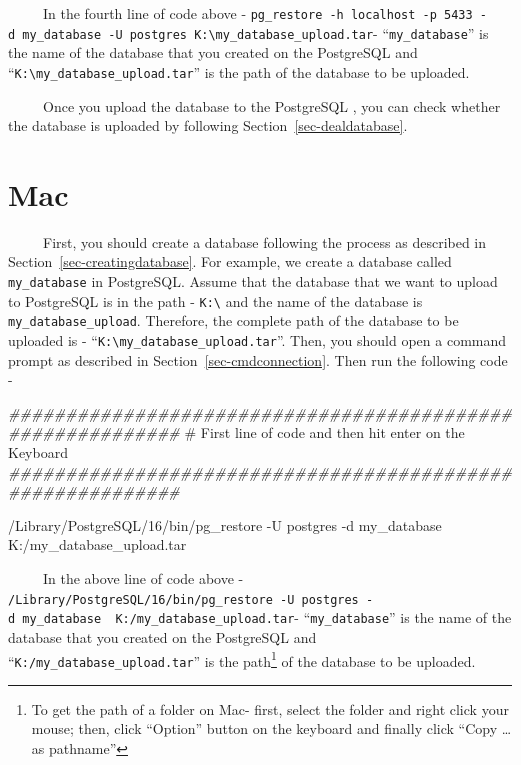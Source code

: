 \documentclass[
  letterpaper,
  DIV=11,
  numbers=noendperiod]{scrreprt}
\newenvironment{Shaded}{\begin{snugshade}}{\end{snugshade}}
\newcommand{\CommentTok}[1]{\textcolor[rgb]{0.37,0.37,0.37}{#1}}
\newcommand{\DecValTok}[1]{\textcolor[rgb]{0.68,0.00,0.00}{#1}}
\newcommand{\DocumentationTok}[1]{\textcolor[rgb]{0.37,0.37,0.37}{\textit{#1}}}
\newcommand{\ErrorTok}[1]{\textcolor[rgb]{0.68,0.00,0.00}{#1}}
\newcommand{\NormalTok}[1]{\textcolor[rgb]{0.00,0.23,0.31}{#1}}
\newcommand{\SpecialCharTok}[1]{\textcolor[rgb]{0.37,0.37,0.37}{#1}}
\begin{document}
~~~~~In the fourth line of code above -
\texttt{pg\_restore\ -h\ localhost\ -p\ 5433\ -d\ my\_database\ -U\ postgres\ K:\textbackslash{}my\_database\_upload.tar}-
``\texttt{my\_database}'' is the name of the database that you created
on the PostgreSQL and
``\texttt{K:\textbackslash{}my\_database\_upload.tar}'' is the path of
the database to be uploaded.

~~~~~Once you upload the database to the PostgreSQL , you can check
whether the database is uploaded by following
Section~\ref{sec-dealdatabase}.

\section{Mac}

~~~~~First, you should create a database following the process as
described in Section~\ref{sec-creatingdatabase}. For example, we create
a database called \texttt{my\_database} in PostgreSQL. Assume that the
database that we want to upload to PostgreSQL is in the path -
\texttt{K:\textbackslash{}} and the name of the database is
\texttt{my\_database\_upload}. Therefore, the complete path of the
database to be uploaded is -
``\texttt{K:\textbackslash{}my\_database\_upload.tar}''. Then, you
should open a command prompt as described in
Section~\ref{sec-cmdconnection}. Then run the following code -

\begin{Shaded}
\begin{Highlighting}[]
\DocumentationTok{\#\#\#\#\#\#\#\#\#\#\#\#\#\#\#\#\#\#\#\#\#\#\#\#\#\#\#\#\#\#\#\#\#\#\#\#\#\#\#\#\#\#\#\#\#\#\#\#\#\#\#\#\#\#\#\#\#\#\#}
\CommentTok{\# First line of code and then hit enter on the Keyboard}
\DocumentationTok{\#\#\#\#\#\#\#\#\#\#\#\#\#\#\#\#\#\#\#\#\#\#\#\#\#\#\#\#\#\#\#\#\#\#\#\#\#\#\#\#\#\#\#\#\#\#\#\#\#\#\#\#\#\#\#\#\#\#\#}

\SpecialCharTok{/}\NormalTok{Library}\SpecialCharTok{/}\NormalTok{PostgreSQL}\SpecialCharTok{/}\DecValTok{16}\SpecialCharTok{/}\NormalTok{bin}\SpecialCharTok{/}\NormalTok{pg\_restore }\SpecialCharTok{{-}}\NormalTok{U postgres }\SpecialCharTok{{-}}\NormalTok{d my\_database  K}\SpecialCharTok{:}\ErrorTok{/}\NormalTok{my\_database\_upload.tar}
\end{Highlighting}
\end{Shaded}

~~~~~In the above line of code above -
\texttt{/Library/PostgreSQL/16/bin/pg\_restore\ -U\ postgres\ -d\ my\_database\ \ K:/my\_database\_upload.tar}-
``\texttt{my\_database}'' is the name of the database that you created
on the PostgreSQL and ``\texttt{K:/my\_database\_upload.tar}'' is the
path\footnote{To get the path of a folder on Mac- first, select the
  folder and right click your mouse; then, click ``Option'' button on
  the keyboard and finally click ``Copy \ldots{} as pathname''} of the
database to be uploaded.
\end{document}
